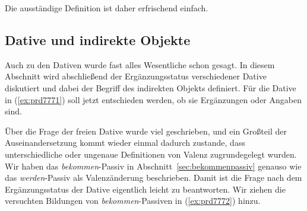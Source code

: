 \begin{exe}
  \ex\label{ex:prd8282}
  \begin{xlist}
  \end{xlist} 
\end{exe}

Die ausständige Definition ist daher erfrischend einfach.


\subsection{Dative und indirekte Objekte}

\label{sec:dativobjekte}

Auch zu den Dativen wurde fast alles Wesentliche schon gesagt.
In diesem Abschnitt wird abschließend der Ergänzungsstatus verschiedener Dative diskutiert und dabei der Begriff des indirekten Objekts definiert.
Für die Dative in (\ref{ex:prd7771}) soll jetzt entschieden werden, ob sie Ergänzungen oder Angaben sind.

\begin{exe}
  \ex\label{ex:prd7771} 
  \begin{xlist}
  \end{xlist}
\end{exe}


Über die Frage der freien Dative wurde viel geschrieben, und ein Großteil der Auseinandersetzung kommt wieder einmal dadurch zustande, dass unterschiedliche oder ungenaue Definitionen von Valenz zugrundegelegt wurden.
Wir haben das \textit{bekommen}-Passiv in Abschnitt~\ref{sec:bekommenpassiv} genauso wie das \textit{werden}-Passiv als Valenzänderung beschrieben.
Damit ist die Frage nach dem Ergänzungsstatus der Dative eigentlich leicht zu beantworten.
Wir ziehen die versuchten Bildungen von \textit{bekommen}-Passiven in (\ref{ex:prd7772}) hinzu.

